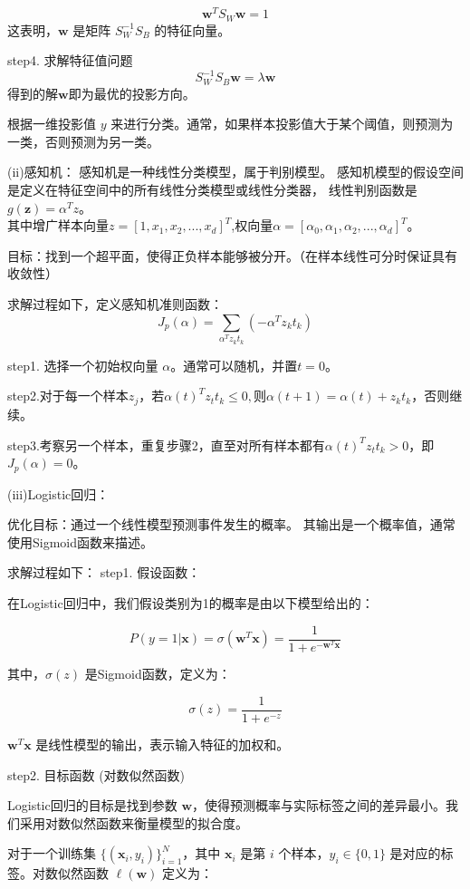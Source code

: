 \documentclass{article}
\begin{document}
\[
\mathbf{w}^T S_W \mathbf{w} = 1
\]
这表明，\( \mathbf{w} \) 是矩阵 \( S_W^{-1} S_B \) 的特征向量。

step4. 求解特征值问题
\[
S_W^{-1} S_B \mathbf{w} = \lambda \mathbf{w}
\]得到的解$\mathbf{w}$即为最优的投影方向。

根据一维投影值 \( y \) 来进行分类。通常，如果样本投影值大于某个阈值，则预测为一类，否则预测为另一类。

(ii)感知机：
感知机是一种线性分类模型，属于判别模型。
感知机模型的假设空间是定义在特征空间中的所有线性分类模型或线性分类器，
线性判别函数是 \( g(\mathbf{z}) = \alpha^T z\)。\\
其中增广样本向量$z=[1,x_1,x_2,...,x_d]^T$,权向量$\alpha=[\alpha_0,\alpha_1,\alpha_2,...,\alpha_d]^T$。

目标：找到一个超平面，使得正负样本能够被分开。（在样本线性可分时保证具有收敛性）

求解过程如下，定义感知机准则函数：
\[J_p(\alpha)=\sum_{\alpha^T z_k t_k}(-\alpha^Tz_k t_k)\]

step1. 选择一个初始权向量 \( \alpha \)。通常可以随机，并置$t=0$。

step2.对于每一个样本$z_j$，若$\alpha(t)^Tz_t t_k\leq0,$则$\alpha(t+1)=\alpha(t)+z_kt_k$，否则继续。

step3.考察另一个样本，重复步骤2，直至对所有样本都有$\alpha(t)^Tz_t t_k>0$，即$J_p(\alpha)=0$。

(iii)Logistic回归：

优化目标：通过一个线性模型预测事件发生的概率。
其输出是一个概率值，通常使用Sigmoid函数来描述。

求解过程如下：
step1. 假设函数：

在Logistic回归中，我们假设类别为1的概率是由以下模型给出的：

\[
P(y = 1 | \mathbf{x}) = \sigma(\mathbf{w}^T \mathbf{x}) = \frac{1}{1 + e^{-\mathbf{w}^T \mathbf{x}}}
\]

其中，\( \sigma(z) \) 是Sigmoid函数，定义为：

\[
\sigma(z) = \frac{1}{1 + e^{-z}}
\]

\(\mathbf{w}^T \mathbf{x}\) 是线性模型的输出，表示输入特征的加权和。

step2. 目标函数 (对数似然函数)

Logistic回归的目标是找到参数 \( \mathbf{w} \)，使得预测概率与实际标签之间的差异最小。我们采用对数似然函数来衡量模型的拟合度。

对于一个训练集 \( \{(\mathbf{x}_i, y_i)\}_{i=1}^{N} \)，其中 \( \mathbf{x}_i \) 是第 \(i\) 个样本，\( y_i \in \{0, 1\} \) 是对应的标签。对数似然函数 \( \ell(\mathbf{w}) \) 定义为：
\end{document}

